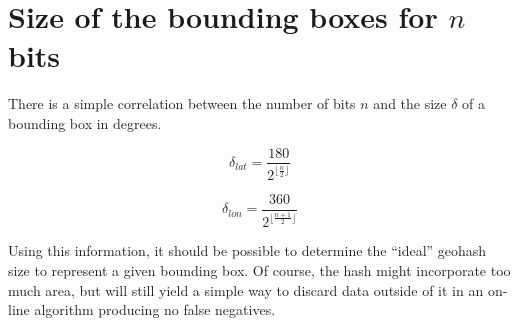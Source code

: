 \documentclass[a4paper,11pt,oneside]{scrartcl}
\begin{document}
\section{Size of the bounding boxes for $n$ bits} %
\label{sec:Size of the bounding boxes for $n$ bits}
There is a simple correlation between the number of bits $n$ and the size $\delta$ of a bounding box in degrees.

\begin{displaymath}
  \delta_{lat} = \frac{180}{2^{\lfloor \frac{n}{2} \rfloor}}
\end{displaymath}

\begin{displaymath}
  \delta_{lon} = \frac{360}{2^{\lfloor \frac{n+1}{2} \rfloor}}
\end{displaymath}

Using this information, it should be possible to determine the “ideal” geohash size to represent a given bounding box. Of course, the hash might incorporate too much area, but will still yield a simple way to discard data outside of it in an on-line algorithm producing no false negatives.




\end{document}

